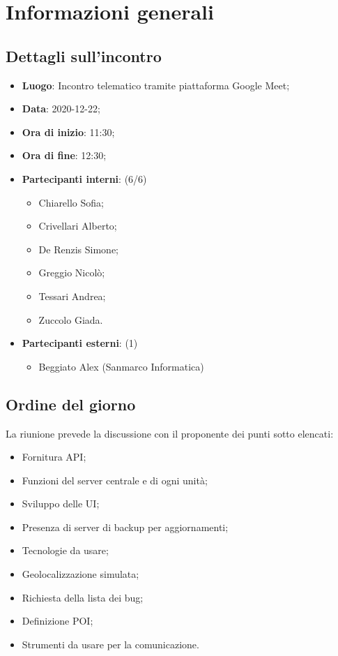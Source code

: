 \section{Informazioni generali}

\subsection{Dettagli sull'incontro}
\begin{itemize}
\item \textbf{Luogo}: Incontro telematico tramite piattaforma Google Meet;
\item \textbf{Data}: 2020-12-22;
\item \textbf{Ora di inizio}: 11:30;
\item \textbf{Ora di fine}: 12:30;
\item \textbf{Partecipanti interni}: (6/6) 
\begin{itemize}
	\item Chiarello Sofia;
	\item Crivellari Alberto;
	\item De Renzis Simone;
	\item Greggio Nicolò;
	\item Tessari Andrea;
	\item Zuccolo Giada.
\end{itemize}
\item \textbf{Partecipanti esterni}: (1) 
\begin{itemize}
	\item Beggiato Alex (Sanmarco Informatica)
\end{itemize}
\end{itemize}

\subsection{Ordine del giorno}

La riunione prevede la discussione con il proponente dei punti sotto elencati:
\begin{itemize}
	\item Fornitura API;
	\item Funzioni del server centrale e di ogni unità;
	\item Sviluppo delle UI;
	\item Presenza di server di backup per aggiornamenti;
	\item Tecnologie da usare;
	\item Geolocalizzazione simulata;
	\item Richiesta della lista dei bug;
	\item Definizione POI;
	\item Strumenti da usare per la comunicazione.
\end{itemize}




